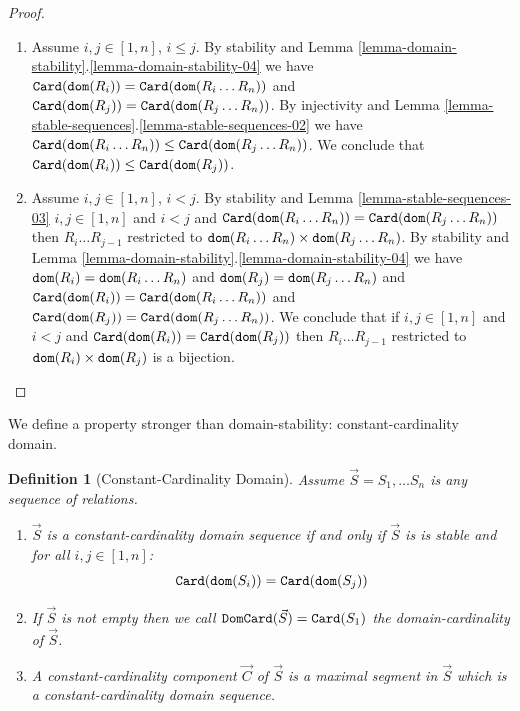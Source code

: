 \documentclass{lmcs}
\newtheorem{definition}[theorem]{Definition}
\begin{document}
\begin{proof}
\begin{enumerate}

\item
Assume $i,j \in [1,n]$, $i \le j$. By stability and
Lemma \ref{lemma-domain-stability}.\ref{lemma-domain-stability-04}
we have
${\tt Card}({\tt dom}(R_i)) = {\tt Card}({\tt dom}(R_i \ldots R_n))$ and
${\tt Card}({\tt dom}(R_j)) = {\tt Card}({\tt dom}(R_j \ldots R_n))$.
By injectivity and Lemma \ref{lemma-stable-sequences}.\ref{lemma-stable-sequences-02}  
we have 
${\tt Card}({\tt dom}(R_i \ldots R_n)) \le {\tt Card}({\tt dom}(R_j \ldots R_n))$.
We conclude that 
${\tt Card}({\tt dom}(R_i)) \le {\tt Card}({\tt dom}(R_j))$.

\item
Assume $i,j \in [1,n]$, $i < j$. By stability and Lemma \ref{lemma-stable-sequences-03}
$i, j \in[1,n]$ and $i < j$ and ${\tt Card}({\tt dom}(R_i \ldots R_n)) = {\tt Card}({\tt dom}(R_j \ldots R_n))$
then $R_i \ldots R_{j-1}$ restricted to ${\tt dom}(R_i \ldots R_n) \times {\tt dom}(R_j \ldots R_n)$.
By stability and
Lemma \ref{lemma-domain-stability}.\ref{lemma-domain-stability-04}
we have
${\tt dom}(R_i) = {\tt dom}(R_i \ldots R_n)$ and
${\tt dom}(R_j) = {\tt dom}(R_j \ldots R_n)$ and
${\tt Card}({\tt dom}(R_i)) = {\tt Card}({\tt dom}(R_i \ldots R_n))$ and
${\tt Card}({\tt dom}(R_j)) = {\tt Card}({\tt dom}(R_j \ldots R_n))$.
We conclude that if 
 $i, j \in[1,n]$ and $i < j$ and ${\tt Card}({\tt dom}(R_i)) = {\tt Card}({\tt dom}(R_j))$
then $R_i \ldots R_{j-1}$ restricted to ${\tt dom}(R_i) \times {\tt dom}(R_j)$
is a bijection.
\end{enumerate}

\end{proof}


We define a property stronger than domain-stability: constant-cardinality domain.


\begin{definition}[Constant-Cardinality Domain]
Assume $\vec{S}=S_1, \ldots S_n$ is any sequence of relations.
\begin{enumerate}

\item
$\vec{S}$ is a constant-cardinality domain sequence if and only if $\vec{S}$ is is stable
and for all $i,j \in [1,n]$:
$$
{\tt Card}({\tt dom}(S_i)) = {\tt Card}({\tt dom}(S_j))
$$

\item
If $\vec{S}$ is not empty then we call ${\tt DomCard}(\vec{S}) = {\tt Card}(S_1)$ 
the domain-cardinality of $\vec{S}$.

\item
A constant-cardinality component $\vec{C}$ of $\vec{S}$ is a maximal segment 
in $\vec{S}$ which is a constant-cardinality domain sequence.
\end{enumerate}
\end{definition}
\end{document}
